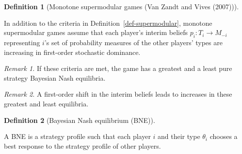 \documentclass[
]{article}
\theoremstyle{definition}
\newtheorem{definition}{Definition}[section]
\theoremstyle{plain}
\theoremstyle{remark}
\begin{document}
\begin{definition}[Monotone supermodular games (Van Zandt and Vives
(2007))]\protect\hypertarget{def-monsupermodular}{}\label{def-monsupermodular}

In addition to the criteria in Definition~\ref{def-supermodular},
monotone supermodular games assume that each player's interim beliefs
\(p_i : T_i \to M_{-i}\) representing \(i\)'s set of probability
measures of the other players' types are increasing in first-order
stochastic dominance.

\emph{Remark 1.} If these criteria are met, the game has a greatest and
a least pure strategy Bayesian Nash equilibria.

\emph{Remark 2.} A first-order shift in the interim beliefs leads to
increases in these greatest and least equilibria.

\end{definition}

\begin{definition}[Bayesian Nash equilibrium
(BNE)]\protect\hypertarget{def-BNE}{}\label{def-BNE}

A BNE is a strategy profile such that each player \(i\) and their type
\(\theta_i\) chooses a best response to the strategy profile of other
players.

\end{definition}
\end{document}
